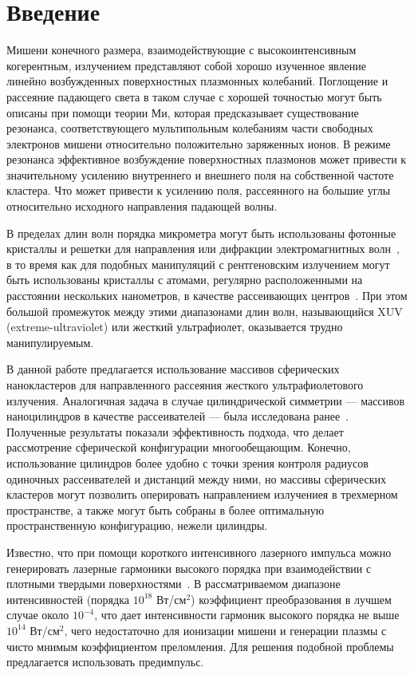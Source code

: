 \section{Введение}

Мишени конечного размера, взаимодействующие с высокоинтенсивным когерентным, излучением представляют собой хорошо изученное явление линейно возбужденных 
поверхностных плазмонных колебаний. Поглощение и рассеяние падающего света в таком случае с хорошей точностью могут быть описаны при помощи теории Ми, которая предсказывает существование резонанса, соответствующего мультипольным колебаниям части свободных электронов мишени относительно положительно заряженных ионов. В режиме резонанса эффективное возбуждение поверхностных плазмонов может привести к значительному усилению внутреннего и внешнего поля на собственной частоте кластера. Что может привести к усилению поля, рассеянного на большие углы относительно исходного направления падающей волны.

В пределах длин волн порядка микрометра могут быть использованы фотонные кристаллы и решетки для направления или дифракции электромагнитных волн~\cite{lin_zhang}, в то время как для подобных манипуляций с рентгеновским излучением могут быть использованы кристаллы с атомами, регулярно расположенными на расстоянии нескольких нанометров, в качестве рассеивающих центров~\cite{batterman_cole}. При этом большой промежуток между этими диапазонами длин волн, называющийся XUV (extreme-ultraviolet) или жесткий ультрафиолет, оказывается трудно манипулируемым.

В данной работе предлагается использование массивов сферических нанокластеров для направленного рассеяния жесткого ультрафиолетового излучения. Аналогичная задача в случае цилиндрической симметрии --- массивов наноцилиндров в качестве рассеивателей --- была исследована ранее~\cite{andreev_lecz}. Полученные результаты показали эффективность подхода, что делает рассмотрение сферической конфигурации многообещающим. Конечно, использование цилиндров более удобно с точки зрения контроля радиусов одиночных рассеивателей и дистанций между ними, но массивы сферических кластеров могут позволить оперировать направлением излучениея в трехмерном пространстве, а также могут быть собраны в более оптимальную пространственную конфигурацию, нежели цилиндры.

Известно, что при помощи короткого интенсивного лазерного импульса можно генерировать лазерные гармоники высокого порядка при взаимодействии с плотными твердыми поверхностями~\cite{teubner_gibbon_hoh}. В рассматриваемом диапазоне интенсивностей (порядка $10^{18}$ Вт/см$^2$) коэффициент преобразования в лучшем случае около $10^{-4}$, что дает интенсивности гармоник высокого порядка не выше $10^{14}$ Вт/см$^2$, чего недостаточно для ионизации мишени и генерации плазмы с чисто мнимым коэффициентом преломления. Для решения подобной проблемы предлагается использовать предимпульс.

